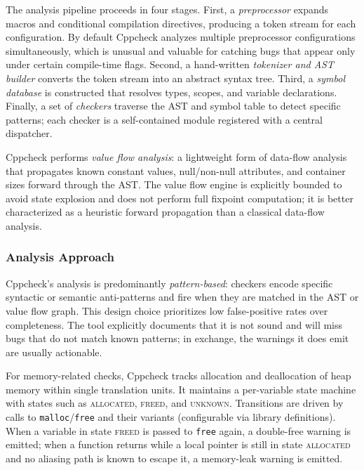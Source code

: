 \documentclass[11pt,a4paper]{article}
\begin{document}
The analysis pipeline proceeds in four stages. First, a \emph{preprocessor} expands macros and conditional compilation directives, producing a token stream for each configuration. By default Cppcheck analyzes multiple preprocessor configurations simultaneously, which is unusual and valuable for catching bugs that appear only under certain compile-time flags. Second, a hand-written \emph{tokenizer and AST builder} converts the token stream into an abstract syntax tree. Third, a \emph{symbol database} is constructed that resolves types, scopes, and variable declarations. Finally, a set of \emph{checkers} traverse the AST and symbol table to detect specific patterns; each checker is a self-contained module registered with a central dispatcher.

Cppcheck performs \emph{value flow analysis}: a lightweight form of data-flow analysis that propagates known constant values, null/non-null attributes, and container sizes forward through the AST. The value flow engine is explicitly bounded to avoid state explosion and does not perform full fixpoint computation; it is better characterized as a heuristic forward propagation than a classical data-flow analysis.

\subsubsection{Analysis Approach}

Cppcheck's analysis is predominantly \emph{pattern-based}: checkers encode specific syntactic or semantic anti-patterns and fire when they are matched in the AST or value flow graph. This design choice prioritizes low false-positive rates over completeness. The tool explicitly documents that it is not sound and will miss bugs that do not match known patterns; in exchange, the warnings it does emit are usually actionable.

For memory-related checks, Cppcheck tracks allocation and deallocation of heap memory within single translation units. It maintains a per-variable state machine with states such as \textsc{allocated}, \textsc{freed}, and \textsc{unknown}. Transitions are driven by calls to \texttt{malloc}/\texttt{free} and their variants (configurable via library definitions). When a variable in state \textsc{freed} is passed to \texttt{free} again, a double-free warning is emitted; when a function returns while a local pointer is still in state \textsc{allocated} and no aliasing path is known to escape it, a memory-leak warning is emitted.
\end{document}
